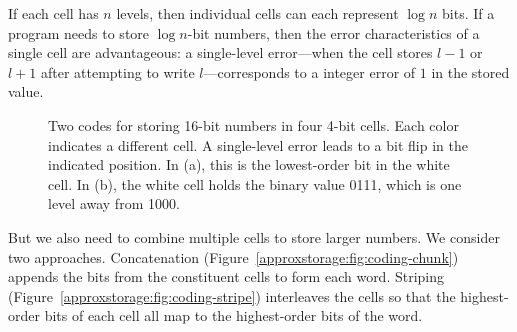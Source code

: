 If each cell has $n$ levels, then individual cells can each
represent $\log n$ bits. If a program needs to store $\log n$-bit
numbers, then the error characteristics of a single cell are
advantageous: a single-level
error---when the cell stores $l-1$ or $l+1$ after attempting to write
$l$---corresponds to a integer error of $1$ in the stored value.

\begin{figure}
    \centering
    \caption{
        Two codes for storing 16-bit numbers in four
        4-bit cells. Each color indicates a different cell.
        A single-level error leads to a bit flip in the indicated
        position.
        In (a), this is the lowest-order bit in the white cell.
        In (b), the white cell holds the binary value 0111, which is one level
        away from 1000.
    }
\end{figure}

But we also need to combine multiple cells to store larger numbers.
We consider two approaches. Concatenation
(Figure~\ref{approxstorage:fig:coding-chunk}) appends the bits from the
constituent cells to form each word. Striping
(Figure~\ref{approxstorage:fig:coding-stripe}) interleaves the cells so that the highest-order
bits of each cell all map to the highest-order bits of the word.


